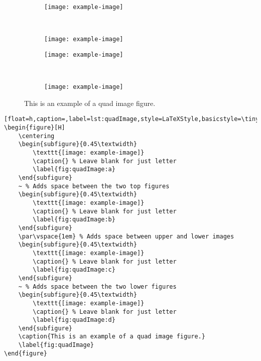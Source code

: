 		\vspace*{\fill}
		\pagebreak



		\vspace*{\fill}
		\begin{figure}[H]
			\centering
			\begin{subfigure}{0.45\textwidth}
				\texttt{[image: example-image]}
				\caption{} %
				\label{fig:quadImage:a}
			\end{subfigure}
			~ %
			\begin{subfigure}{0.45\textwidth}
				\texttt{[image: example-image]}
				\caption{} %
				\label{fig:quadImage:b}
			\end{subfigure}
			\par\vspace{1em} %
			\begin{subfigure}{0.45\textwidth}
				\texttt{[image: example-image]}
				\caption{} %
				\label{fig:quadImage:c}
			\end{subfigure}
			~ %
			\begin{subfigure}{0.45\textwidth}
				\texttt{[image: example-image]}
				\caption{} %
				\label{fig:quadImage:d}
			\end{subfigure}
			\caption{This is an example of a quad image figure.}
			\label{fig:quadImage}
		\end{figure}
		\begin{lstlisting}[float=h,caption=,label=lst:quadImage,style=LaTeXStyle,basicstyle=\tiny\ttfamily,]
\begin{figure}[H]
	\centering
	\begin{subfigure}{0.45\textwidth}
		\texttt{[image: example-image]}
		\caption{} % Leave blank for just letter
		\label{fig:quadImage:a}
	\end{subfigure}
	~ % Adds space between the two top figures
	\begin{subfigure}{0.45\textwidth}
		\texttt{[image: example-image]}
		\caption{} % Leave blank for just letter
		\label{fig:quadImage:b}
	\end{subfigure}
	\par\vspace{1em} % Adds space between upper and lower images
	\begin{subfigure}{0.45\textwidth}
		\texttt{[image: example-image]}
		\caption{} % Leave blank for just letter
		\label{fig:quadImage:c}
	\end{subfigure}
	~ % Adds space between the two lower figures
	\begin{subfigure}{0.45\textwidth}
		\texttt{[image: example-image]}
		\caption{} % Leave blank for just letter
		\label{fig:quadImage:d}
	\end{subfigure}
	\caption{This is an example of a quad image figure.}
	\label{fig:quadImage}
\end{figure}
		\end{lstlisting}
		\vspace*{\fill}
		\pagebreak